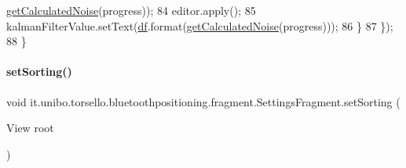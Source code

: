 \begin{DoxyCode}
      \hyperlink{classit_1_1unibo_1_1torsello_1_1bluetoothpositioning_1_1fragment_1_1SettingsFragment_a595d859602f34ca81957a0578c1602a6_a595d859602f34ca81957a0578c1602a6}{getCalculatedNoise}(progress));
84                 editor.apply();
85                 kalmanFilterValue.setText(\hyperlink{classit_1_1unibo_1_1torsello_1_1bluetoothpositioning_1_1fragment_1_1SettingsFragment_af6b80a700dc80c39a56d001b68a47694_af6b80a700dc80c39a56d001b68a47694}{df}.format(\hyperlink{classit_1_1unibo_1_1torsello_1_1bluetoothpositioning_1_1fragment_1_1SettingsFragment_a595d859602f34ca81957a0578c1602a6_a595d859602f34ca81957a0578c1602a6}{getCalculatedNoise}(progress)));
86             \}
87         \});
88     \}
\end{DoxyCode}
\hypertarget{classit_1_1unibo_1_1torsello_1_1bluetoothpositioning_1_1fragment_1_1SettingsFragment_ae29f0b3d6fc60f1ceeab5dcc530166c1_ae29f0b3d6fc60f1ceeab5dcc530166c1}{}\label{classit_1_1unibo_1_1torsello_1_1bluetoothpositioning_1_1fragment_1_1SettingsFragment_ae29f0b3d6fc60f1ceeab5dcc530166c1_ae29f0b3d6fc60f1ceeab5dcc530166c1} 
\paragraph{\texorpdfstring{set\+Sorting()}{setSorting()}}
{\footnotesize\ttfamily void it.\+unibo.\+torsello.\+bluetoothpositioning.\+fragment.\+Settings\+Fragment.\+set\+Sorting (\begin{DoxyParamCaption}\item[{View}]{root }\end{DoxyParamCaption})\hspace{0.3cm}{\ttfamily [private]}}


